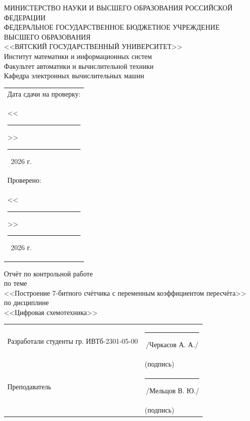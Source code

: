 \documentclass[oneside,a4paper,14pt]{extarticle}
\begin{document}
\newpage
\thispagestyle{empty}
\begin{center}
  МИНИСТЕРСТВО НАУКИ И ВЫСШЕГО ОБРАЗОВАНИЯ РОССИЙСКОЙ ФЕДЕРАЦИИ\\
  ФЕДЕРАЛЬНОЕ ГОСУДАРСТВЕННОЕ БЮДЖЕТНОЕ УЧРЕЖДЕНИЕ ВЫСШЕГО ОБРАЗОВАНИЯ\\
  <<ВЯТСКИЙ ГОСУДАРСТВЕННЫЙ УНИВЕРСИТЕТ>>\\
  Институт математики и информационных систем\\
  Факультет автоматики и вычислительной техники\\
  Кафедра электронных вычислительных машин
\end{center}
\vspace{10mm}

\hfill
\begin{tabular}{l}
  \footnotesize Дата сдачи на проверку:                                          \\
  \footnotesize <<\rule[-1mm]{5mm}{0.10mm}\/>>\rule[-1mm]{20mm}{0.10mm}\ 2026 г. \\
  \footnotesize Проверено:                                                       \\
  \footnotesize <<\rule[-1mm]{5mm}{0.10mm}\/>>\rule[-1mm]{20mm}{0.10mm}\ 2026 г. \\
\end{tabular}
\vfill

\begin{center}
  Отчёт по контрольной работе\\
  по теме\\
  <<Построение 7-битного счётчика с переменным коэффициентом пересчёта>>\\
  по дисциплине\\
  <<Цифровая схемотехника>>\\
\end{center}
\vspace{25mm}
\noindent
\begin{tabular}{ll}
  Разработали студенты гр. ИВТб-2301-05-00 & \hspace{5mm}\rule[-1mm]{30mm}{0.10mm}\,/Черкасов А. А./ \\
                                           & \hspace{12.5mm}\footnotesize(подпись)                   \\
  Преподаватель                            & \hspace{5mm}\rule[-1mm]{30mm}{0.10mm}\,/Мельцов В. Ю./  \\
                                           & \hspace{12.5mm}\footnotesize(подпись)                   \\
\end{tabular}
\end{document}
